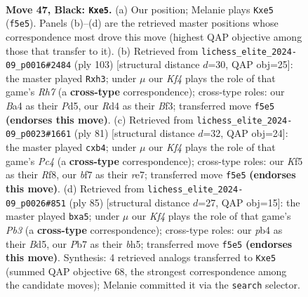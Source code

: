\documentclass[11pt]{article}
\begin{document}
\clearpage

\begin{figure}[p]\centering
\begin{subfigure}{0.46\textwidth}\centering
\resizebox{\linewidth}{!}{%
\newchessgame
\chessboard[
  setfen={r7/1p3BR1/p7/4Pk1p/bP1r4/P6K/8/R7 b - - 8 47},
  showmover=false,
  pgfstyle=straightmove, color=movearrow, markmove={f5-e5}
]}
\caption{}
\end{subfigure}\hfill
\begin{subfigure}{0.46\textwidth}\centering
\resizebox{\linewidth}{!}{%
\newchessgame
\chessboard[
  setfen={8/1R2B3/5pk1/3p4/p2P4/P4b1P/7r/5K2 b - - 4 52},
  showmover=false,
  pgfstyle=straightmove, color=movearrow, markmove={h2-h3}
]}
\caption{}
\end{subfigure}
\\[4pt]
\begin{subfigure}{0.46\textwidth}\centering
\resizebox{\linewidth}{!}{%
\newchessgame
\chessboard[
  setfen={5r2/4RPp1/1pk5/2p4p/1P3b2/7P/P3K3/8 b - - 0 41},
  showmover=false,
  pgfstyle=straightmove, color=movearrow, markmove={c5-b4}
]}
\caption{}
\end{subfigure}\hfill
\begin{subfigure}{0.46\textwidth}\centering
\resizebox{\linewidth}{!}{%
\newchessgame
\chessboard[
  setfen={6k1/R7/1p2p3/P2b3B/1P6/4p1PP/2r5/6K1 b - - 0 43},
  showmover=false,
  pgfstyle=straightmove, color=movearrow, markmove={b6-a5}
]}
\caption{}
\end{subfigure}
\caption{\textbf{Move 47, Black: \texttt{Kxe5}.} (a) Our position; Melanie plays \texttt{Kxe5} (\texttt{f5e5}). Panels (b)--(d) are the retrieved master positions whose correspondence most drove this move (highest QAP objective among those that transfer to it). (b) Retrieved from \texttt{lichess\_elite\_2024-09\_p0016\#2484} (ply 103) [structural distance $d$=30, QAP obj=25]: the master played \texttt{Rxh3}; under $\mu$ our \emph{Kf4} plays the role of that game's \emph{Rh7} (a \textbf{cross-type} correspondence); cross-type roles: our \emph{B}a4 as their \emph{P}d5, our \emph{R}d4 as their \emph{B}f3; transferred move \texttt{f5e5} \textbf{(endorses this move)}. (c) Retrieved from \texttt{lichess\_elite\_2024-09\_p0023\#1661} (ply 81) [structural distance $d$=32, QAP obj=24]: the master played \texttt{cxb4}; under $\mu$ our \emph{Kf4} plays the role of that game's \emph{Pc4} (a \textbf{cross-type} correspondence); cross-type roles: our \emph{K}f5 as their \emph{R}f8, our \emph{b}f7 as their \emph{r}e7; transferred move \texttt{f5e5} \textbf{(endorses this move)}. (d) Retrieved from \texttt{lichess\_elite\_2024-09\_p0026\#851} (ply 85) [structural distance $d$=27, QAP obj=15]: the master played \texttt{bxa5}; under $\mu$ our \emph{Kf4} plays the role of that game's \emph{Pb3} (a \textbf{cross-type} correspondence); cross-type roles: our \emph{p}b4 as their \emph{B}d5, our \emph{P}b7 as their \emph{b}h5; transferred move \texttt{f5e5} \textbf{(endorses this move)}. Synthesis: 4 retrieved analogs transferred to \texttt{Kxe5} (summed QAP objective 68, the strongest correspondence among the candidate moves); Melanie committed it via the \texttt{search} selector.}
\label{fig:thought-m93}
\end{figure}
\end{document}
